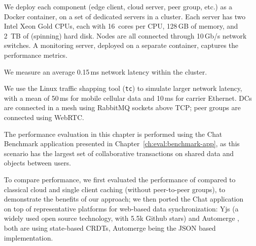 
We deploy each \system{} component (edge client, cloud server, peer group, etc.)
as a Docker container, on a set of dedicated servers in a cluster.
Each server has two Intel Xeon Gold CPUs, each with 16~cores per CPU,
128\,GB of memory, and 2~TB of (spinning) hard disk.
Nodes are all connected through 10\,Gb/s network switches.
A monitoring server, deployed on a separate container, captures the performance 
metrics.

We measure an average 0.15\,ms network latency within the cluster.

We use the Linux traffic shapping tool (\texttt{tc}) to simulate larger network 
latency, with a mean of
50\,ms for mobile cellular data and 10\,ms for carrier Ethernet.
DCs are connected in a mesh using RabbitMQ sockets above TCP;
peer groups are connected using WebRTC.

The performance evaluation in this chapter is performed using the \system{}Chat 
Benchmark application presented in Chapter~\ref{ch:eval:benchmark-app},
as this scenario has the largest set of collaborative transactions on 
shared data and objects between users.

To compare performance, we first evaluated the performance of \system{} compared
to classical cloud and single client caching (without peer-to-peer groups), 
to demonstrate the benefits of our approach; we then ported the \system{}Chat
application on top of representative platforms for web-based data synchronization:
Yjs \cite{yjsyjsSh56:online} 
(a widely used open source technology, with 5.5k Github stars) 
and Automerge \cite{kleppmann2018automerge},
both are using state-based CRDTs, Automerge being the JSON based implementation.
